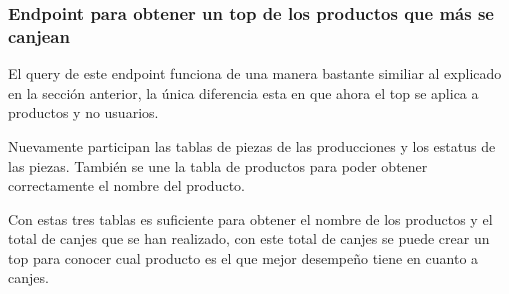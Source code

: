 \subsubsection{Endpoint para obtener un top de los productos que más se canjean}
El query de este endpoint funciona de una manera bastante similiar al explicado en la sección anterior, la única diferencia esta en que ahora el top se aplica a productos y no usuarios.

Nuevamente participan las tablas de piezas de las producciones y los estatus de las piezas. También se une la tabla de productos para poder obtener correctamente el nombre del producto.

Con estas tres tablas es suficiente para obtener el nombre de los productos y el total de canjes que se han realizado, con este total de canjes se puede crear un top para conocer cual producto es el que mejor desempeño tiene en cuanto a canjes.